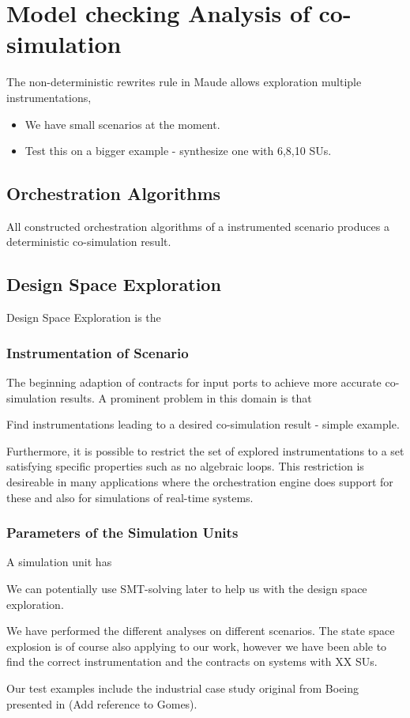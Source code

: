 \section{Model checking Analysis of co-simulation}
The non-deterministic rewrites rule in Maude allows exploration multiple instrumentations, 


\begin{itemize}
    \item We have small scenarios at the moment.
    \item Test this on a bigger example - synthesize one with 6,8,10 SUs.
\end{itemize}


\subsection{Orchestration Algorithms}
All constructed orchestration algorithms of a instrumented scenario produces a deterministic co-simulation result.




\subsection{Design Space Exploration}
Design Space Exploration is the 

\subsubsection{Instrumentation of Scenario}
The beginning adaption of contracts for input ports to achieve more accurate co-simulation results. 
A prominent problem in this domain is that   

Find instrumentations leading to a desired co-simulation result - simple example. 

Furthermore, it is possible to restrict the set of explored instrumentations to a set satisfying specific properties such as no algebraic loops.
This restriction is desireable in many applications where the orchestration engine does support for these and also for simulations of real-time systems.

\subsubsection{Parameters of the Simulation Units}
A simulation unit has 



We can potentially use SMT-solving later to help us with the design space exploration.


We have performed the different analyses on different scenarios. 
The state space explosion is of course also applying to our work, however we have been able to find the correct instrumentation and the contracts on systems with XX SUs.

Our test examples include the industrial case study original from Boeing presented in (Add reference to Gomes). 
